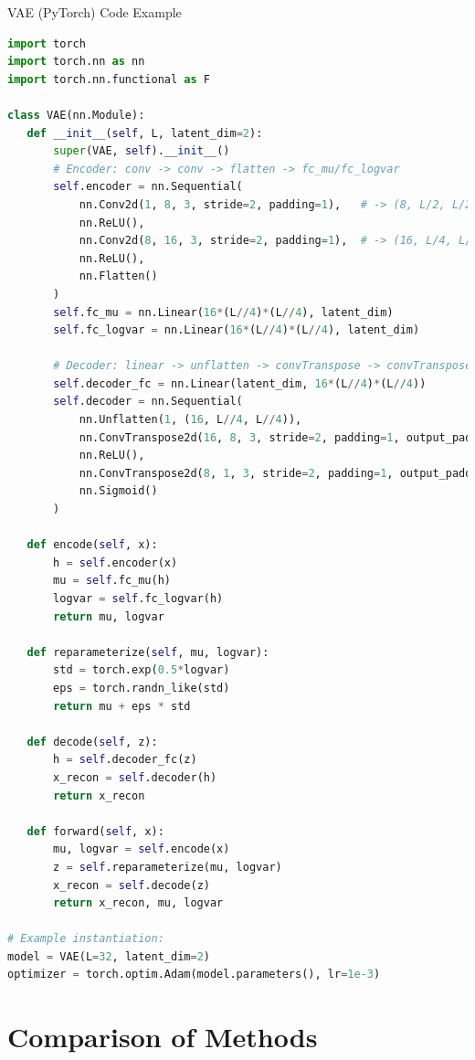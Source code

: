 \documentclass{beamer}
\begin{document}
\begin{frame}[fragile]{VAE (PyTorch) Code Example}
 \begin{lstlisting}[language=Python]
import torch
import torch.nn as nn
import torch.nn.functional as F

class VAE(nn.Module):
   def __init__(self, L, latent_dim=2):
       super(VAE, self).__init__()
       # Encoder: conv -> conv -> flatten -> fc_mu/fc_logvar
       self.encoder = nn.Sequential(
           nn.Conv2d(1, 8, 3, stride=2, padding=1),   # -> (8, L/2, L/2)
           nn.ReLU(),
           nn.Conv2d(8, 16, 3, stride=2, padding=1),  # -> (16, L/4, L/4)
           nn.ReLU(),
           nn.Flatten()
       )
       self.fc_mu = nn.Linear(16*(L//4)*(L//4), latent_dim)
       self.fc_logvar = nn.Linear(16*(L//4)*(L//4), latent_dim)

       # Decoder: linear -> unflatten -> convTranspose -> convTranspose
       self.decoder_fc = nn.Linear(latent_dim, 16*(L//4)*(L//4))
       self.decoder = nn.Sequential(
           nn.Unflatten(1, (16, L//4, L//4)),
           nn.ConvTranspose2d(16, 8, 3, stride=2, padding=1, output_padding=1),  # -> (8, L/2, L/2)
           nn.ReLU(),
           nn.ConvTranspose2d(8, 1, 3, stride=2, padding=1, output_padding=1),   # -> (1, L, L)
           nn.Sigmoid()
       )

   def encode(self, x):
       h = self.encoder(x)
       mu = self.fc_mu(h)
       logvar = self.fc_logvar(h)
       return mu, logvar

   def reparameterize(self, mu, logvar):
       std = torch.exp(0.5*logvar)
       eps = torch.randn_like(std)
       return mu + eps * std

   def decode(self, z):
       h = self.decoder_fc(z)
       x_recon = self.decoder(h)
       return x_recon

   def forward(self, x):
       mu, logvar = self.encode(x)
       z = self.reparameterize(mu, logvar)
       x_recon = self.decode(z)
       return x_recon, mu, logvar

# Example instantiation:
model = VAE(L=32, latent_dim=2)
optimizer = torch.optim.Adam(model.parameters(), lr=1e-3)
 \end{lstlisting}
\end{frame}

\section{Comparison of Methods}
\end{document}
